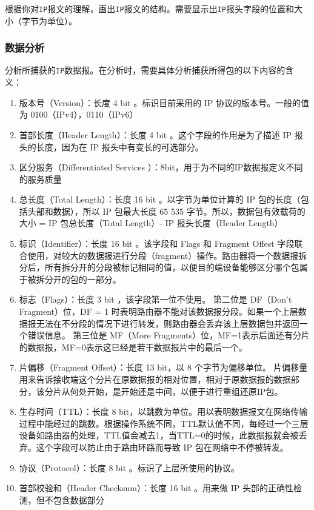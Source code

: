 \documentclass{article}
\begin{document}
根据你对\texttt{IP}报文的理解，画出\texttt{IP}报文的结构。需要显示出\texttt{IP}报头字段的位置和大小（字节为单位）。

\subsubsection{数据分析}

分析所捕获的\texttt{IP}数据报。在分析时，需要具体分析捕获所得包的以下内容的含义：

\begin{enumerate}[noitemsep]
  \item 版本号（Version）：长度 4 bit 。标识目前采用的 IP 协议的版本号。一般的值为 0100（IPv4），0110（IPv6）
  \item 首部长度（Header Length）：长度 4 bit 。这个字段的作用是为了描述 IP 报头的长度，因为在 IP
        报头中有变长的可选部分。
  \item 区分服务（Differentiated Services ）：8bit，用于为不同的IP数据报定义不同的服务质量
  \item 总长度（Total Length）：长度 16 bit 。以字节为单位计算的 IP 包的长度（包括头部和数据），所以 IP 包最大长度 65
        535 字节。所以，数据包有效载荷的大小 = IP 包总长度（Total Length）- IP 报头长度（Header Length）
  \item 标识（Identifier）：长度 16 bit 。该字段和 Flags 和 Fragment Offest 字段联合使用，对较大的数据报进行分段（fragment）操作。路由器将一个数据报拆分后，所有拆分开的分段被标记相同的值，以便目的端设备能够区分哪个包属于被拆分开的包的一部分。
  \item 标志（Flags）：长度 3 bit ，该字段第一位不使用。
        第二位是 DF（Don’t Fragment）位，DF = 1 时表明路由器不能对该数据报分段。如果一个上层数据报无法在不分段的情况下进行转发，则路由器会丢弃该上层数据包并返回一个错误信息。
        第三位是 MF（More Fragments）位，MF=1表示后面还有分片的数据报，MF=0表示这已经是若干数据报片中的最后一个。
  \item 片偏移（Fragment Offset）：长度 13 bit，以 8 个字节为偏移单位。 片偏移量用来告诉接收端这个分片在原数据报的相对位置，相对于原数据报的数据部分，该分片从何处开始，是开始还是中间，以便于进行重组还原IP包。
  \item 生存时间（TTL）：长度 8 bit，以跳数为单位。用以表明数据报文在网络传输过程中能经过的跳数。根据操作系统不同，TTL默认值不同，每经过一个三层设备如路由器的处理，TTL值会减去1，当TTL=0的时候，此数据报就会被丢弃。这个字段可以防止由于路由环路而导致 IP 包在网络中不停被转发。
  \item 协议（Protocol）：长度 8 bit 。标识了上层所使用的协议。
  \item 首部校验和（Header Checksum）：长度 16 bit 。用来做 IP 头部的正确性检测，但不包含数据部分

\end{enumerate}
\end{document}
